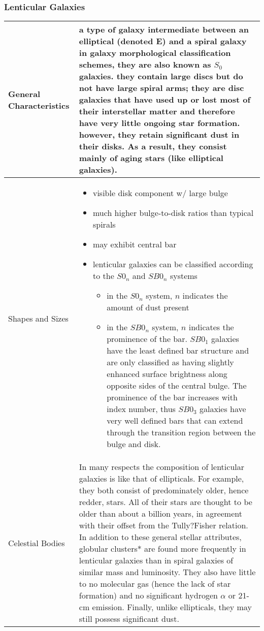 \subsubsection{Lenticular Galaxies}
\begin{longtabu} to 
\hline
	General Characteristics &
	a type of galaxy intermediate between an elliptical (denoted E) and a spiral galaxy in galaxy morphological classification schemes, they are also known as $S_0$ galaxies. they contain large discs but do not have large spiral arms; they are disc galaxies that have used up or lost most of their interstellar matter and therefore have very little ongoing star formation. however, they retain significant dust in their disks. As a result, they consist mainly of aging stars (like elliptical galaxies). 
	\\
	\hline
	Shapes and Sizes &
	\begin{itemize}[noitemsep]
		\item visible disk component w/ large bulge 
		\item much higher bulge-to-disk ratios than typical spirals
		\item may exhibit central bar
		\item lenticular galaxies can be classified according to the $S0_n$ and $SB0_n$ systems
			\begin{itemize}[noitemsep]
				\item in the $S0_n$ system, $n$ indicates the amount of dust present
				\item in the $SB0_n$ system, $n$ indicates the prominence of the bar. $SB0_1$ galaxies have the least defined bar structure and are only classified as having slightly enhanced surface brightness along opposite sides of the central bulge. The prominence of the bar increases with index number, thus $SB0_3$ galaxies have very well defined bars that can extend through the transition region between the bulge and disk.
			\end{itemize}
	\end{itemize}
	\\
	\hline
	Celestial Bodies &
	In many respects the composition of lenticular galaxies is like that of ellipticals. For example, they both consist of predominately older, hence redder, stars. All of their stars are thought to be older than about a billion years, in agreement with their offset from the Tully?Fisher relation. In addition to these general stellar attributes, globular clusters* are found more frequently in lenticular galaxies than in spiral galaxies of similar mass and luminosity. They also have little to no molecular gas (hence the lack of star formation) and no significant hydrogen $\alpha$ or 21-cm emission. Finally, unlike ellipticals, they may still possess significant dust.

\end{longtabu}
